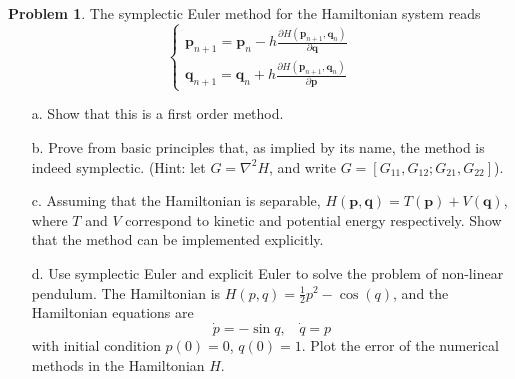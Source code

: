 \documentclass[a4paper, 10pt]{article}
\theoremstyle{definition}
\newtheorem{problem}{Problem}
\theoremstyle{hSol}
\begin{document}
\begin{problem} The symplectic Euler method for the Hamiltonian system reads
\begin{equation}
\begin{cases}
  \bm{p}_{n+1} = \bm{p}_n - h \frac{\partial H(\bm{p}_{n+1}, \bm{q}_n)}{\partial \bm{q}} \\
  \bm{q}_{n+1} = \bm{q}_n + h \frac{\partial H(\bm{p}_{n+1}, \bm{q}_n)}{\partial \bm{p}}
\end{cases}
\end{equation}
\begin{itemize}
  \item[a.] Show that this is a first order method.
  \item[b.] Prove from basic principles that, as implied by its name, the method is indeed symplectic. (Hint: let $G=\nabla^2 H$, and write $G=[G_{11}, G_{12}; G_{21}, G_{22}]$).
  \item[c.] Assuming that the Hamiltonian is separable, $H(\bm{p}, \bm{q})=T(\bm{p})+V(\bm{q})$, where $T$ and $V$ correspond to kinetic and potential energy respectively. Show that the method can be implemented explicitly.
  \item[d.] Use symplectic Euler and explicit Euler to solve the problem of non-linear pendulum. The Hamiltonian is $H(p,q)=\frac{1}{2}p^2 - \cos({q})$, and the Hamiltonian equations are
  $$
  \dot{p} = -\sin q,~~~~\dot{q} = p
  $$
  with initial condition $p(0)=0$, $q(0)=1$. Plot the error of the numerical methods in the Hamiltonian $H$.
\end{itemize}
\end{problem}
\end{document}
